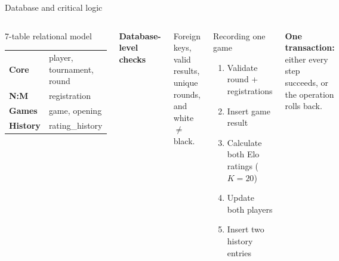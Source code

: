 \documentclass[aspectratio=169,11pt]{beamer}
\begin{document}
\begin{frame}{Database and critical logic}
\vspace{0.25cm}
\begin{columns}[T,onlytextwidth]
  \begin{block}{7-table relational model}
    \small
    \begin{tabular}{@{}ll@{}}
      \textbf{Core} & player, tournament, round \\
      \textbf{N:M} & registration \\
      \textbf{Games} & game, opening \\
      \textbf{History} & rating\_history \\
    \end{tabular}
  \end{block}
  \vspace{0.25cm}
  \small
  \textbf{Database-level checks}\par
  Foreign keys, valid results, unique rounds, and white $\neq$ black.

  \begin{block}{Recording one game}
    \small
    \begin{enumerate}\setlength\itemsep{0.25em}
      \item Validate round + registrations
      \item Insert game result
      \item Calculate both Elo ratings ($K=20$)
      \item Update both players
      \item Insert two history entries
    \end{enumerate}
  \end{block}
  \vspace{0.25cm}
  \small\textbf{One transaction:} either every step succeeds, or the operation rolls back.
\end{columns}
\end{frame}
\end{document}

